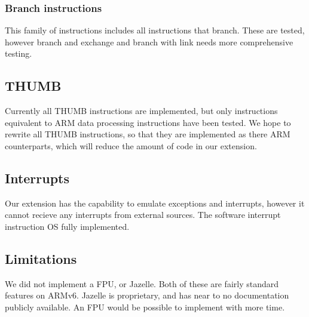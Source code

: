 \documentclass{article}
\begin{document}
\subsubsection{Branch instructions}
This family of instructions includes all instructions that branch. These are tested, however branch and exchange and branch with link needs more comprehensive testing. 

\subsection{THUMB}
Currently all THUMB instructions are implemented, but only instructions equivalent to ARM data processing instructions have been tested. We hope to rewrite all THUMB instructions, so that they are implemented as there ARM counterparts, which will reduce the amount of code in our extension. 

\subsection{Interrupts}
Our extension has the capability to emulate exceptions and interrupts, however it cannot recieve any interrupts from external sources. The software interrupt instruction OS fully implemented. 

\subsection{Limitations}
We did not implement a FPU, or Jazelle. Both of these are fairly standard features on ARMv6. Jazelle is proprietary, and has near to no documentation publicly available. An FPU would be possible to implement with more time. 
\end{document}
